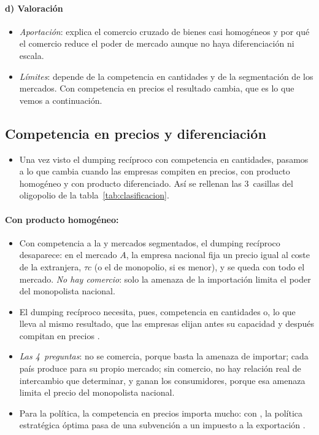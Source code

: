 \documentclass[11pt]{article}
\begin{document}
\paragraph{d) Valoración}

\begin{itemize}
\item \emph{Aportación}: explica el comercio cruzado de bienes casi homogéneos y por qué el comercio reduce el poder de mercado aunque no haya diferenciación ni escala.
\item \emph{Límites}: depende de la competencia en cantidades y de la segmentación de los mercados. Con competencia en precios el resultado cambia, que es lo que vemos a continuación.
\end{itemize}

\subsection{Competencia en precios y diferenciación}\label{sec:precios}

\begin{itemize}
\item Una vez visto el dumping recíproco con competencia en cantidades, pasamos a lo que cambia cuando las empresas compiten en precios, con producto homogéneo y con producto diferenciado. Así se rellenan las 3~casillas del oligopolio de la tabla~\ref{tab:clasificacion}.
\end{itemize}

\paragraph{Con producto homogéneo: }

\begin{itemize}
\item Con competencia a la   y mercados segmentados, el dumping recíproco desaparece: en el mercado $A$, la empresa nacional fija un precio igual al coste de la extranjera, $\tau c$ (o el de monopolio, si es menor), y se queda con todo el mercado. \emph{No hay comercio}: solo la amenaza de la importación limita el poder del monopolista nacional.
\item El dumping recíproco necesita, pues, competencia en cantidades o, lo que lleva al mismo resultado, que las empresas elijan antes su capacidad y después compitan en precios\nocite{KrepsScheinkman1983Quantity} .
\item \emph{Las 4~preguntas}: no se comercia, porque basta la amenaza de importar; cada país produce para su propio mercado; sin comercio, no hay relación real de intercambio que determinar, y ganan los consumidores, porque esa amenaza limita el precio del monopolista nacional.
\item Para la política, la competencia en precios importa mucho: con , la política estratégica óptima pasa de una subvención a un impuesto a la exportación\nocite{EatonGrossman1986Optimal} .
\end{itemize}
\end{document}
